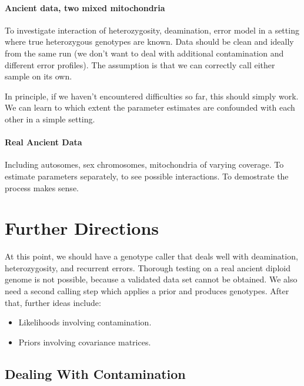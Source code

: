 \documentclass{article}
\begin{document}

\paragraph{Ancient data, two mixed mitochondria}

To investigate interaction of heterozygosity, deamination, error model
in a setting where true heterozygous genotypes are known.  Data should
be clean and ideally from the same run (we don't want to deal with
additional contamination and different error profiles).  The assumption
is that we can correctly call either sample on its own.

In principle, if we haven't encountered difficulties so far, this should
simply work.  We can learn to which extent the parameter estimates are
confounded with each other in a simple setting.

\paragraph{Real Ancient Data}

Including autosomes, sex chromosomes, mitochondria of
varying coverage.  To estimate parameters separately, to see possible
interactions.  To demostrate the process makes sense. 


\section{Further Directions}

At this point, we should have a genotype caller that deals well with
deamination, heterozygosity, and recurrent errors.  Thorough testing on
a real ancient diploid genome is not possible, because a validated data
set cannot be obtained.  We also need a second calling step which
applies a prior and produces genotypes.  After that, further ideas
include: 

\begin{itemize}
\item Likelihoods involving contamination.
\item Priors involving covariance matrices.
\end{itemize}

\subsection{Dealing With Contamination}
\end{document}
